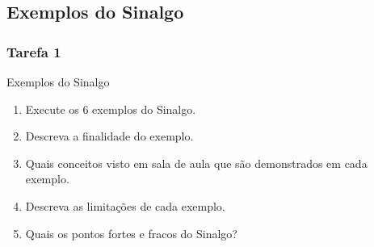 \documentclass{beamer}
\begin{document}
\subsection{Exemplos do Sinalgo} %
\begin{frame}
	\frametitle{Tarefa 1}
	
	\begin{alertblock}{Exemplos do Sinalgo}
		\begin{enumerate}
			\item Execute os 6 exemplos do Sinalgo.
			\item Descreva a finalidade do exemplo.
			\item Quais conceitos visto em sala de aula que são demonstrados em cada exemplo.
			\item Descreva as limitações de cada exemplo.
			\item Quais os pontos fortes e fracos do Sinalgo?
		\end{enumerate}
	\end{alertblock}
\end{frame}

\end{document}
